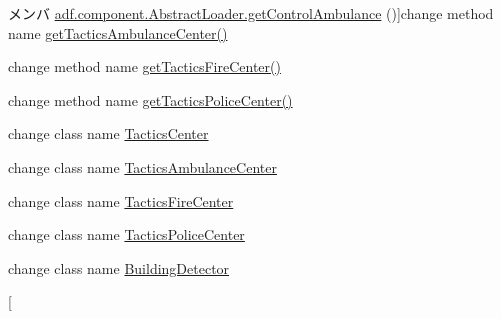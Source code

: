 \begin{DoxyRefList}
\hypertarget{deprecated__deprecated000006}{}%
メンバ \hyperlink{classadf_1_1component_1_1AbstractLoader_a2044c317869b16349d4fdbf7d5d50dcd}{adf.component.Abstract\+Loader.get\+Control\+Ambulance} ()]change method name \hyperlink{}{get\+Tactics\+Ambulance\+Center()}  
\item[\label{deprecated__deprecated000007}%
\hypertarget{deprecated__deprecated000007}{}%
メンバ \hyperlink{classadf_1_1component_1_1AbstractLoader_a66e4649d775d291dda3e5b977596bccf}{adf.component.Abstract\+Loader.get\+Control\+Fire} ()]change method name \hyperlink{}{get\+Tactics\+Fire\+Center()}  
\item[\label{deprecated__deprecated000008}%
\hypertarget{deprecated__deprecated000008}{}%
メンバ \hyperlink{classadf_1_1component_1_1AbstractLoader_a2917adfedf677a3af006521e64996a42}{adf.component.Abstract\+Loader.get\+Control\+Police} ()]change method name \hyperlink{}{get\+Tactics\+Police\+Center()}  
\item[\label{deprecated__deprecated000009}%
\hypertarget{deprecated__deprecated000009}{}%
クラス \hyperlink{classadf_1_1component_1_1control_1_1Control}{adf.component.control.Control} ]change class name \hyperlink{}{Tactics\+Center}  
\item[\label{deprecated__deprecated000010}%
\hypertarget{deprecated__deprecated000010}{}%
クラス \hyperlink{classadf_1_1component_1_1control_1_1ControlAmbulance}{adf.component.control.Control\+Ambulance} ]change class name \hyperlink{}{Tactics\+Ambulance\+Center}  
\item[\label{deprecated__deprecated000011}%
\hypertarget{deprecated__deprecated000011}{}%
クラス \hyperlink{classadf_1_1component_1_1control_1_1ControlFire}{adf.component.control.Control\+Fire} ]change class name \hyperlink{}{Tactics\+Fire\+Center}  
\item[\label{deprecated__deprecated000012}%
\hypertarget{deprecated__deprecated000012}{}%
クラス \hyperlink{classadf_1_1component_1_1control_1_1ControlPolice}{adf.component.control.Control\+Police} ]change class name \hyperlink{}{Tactics\+Police\+Center}  
\item[\label{deprecated__deprecated000013}%
\hypertarget{deprecated__deprecated000013}{}%
クラス \hyperlink{classadf_1_1component_1_1module_1_1complex_1_1BuildingSelector}{adf.component.module.complex.Building\+Selector} ]change class name \hyperlink{classadf_1_1component_1_1module_1_1complex_1_1BuildingDetector}{Building\+Detector}  
\item[\label{deprecated__deprecated000014}%
\hypertarget{deprecated__deprecated000014}{}%

\end{DoxyRefList}
